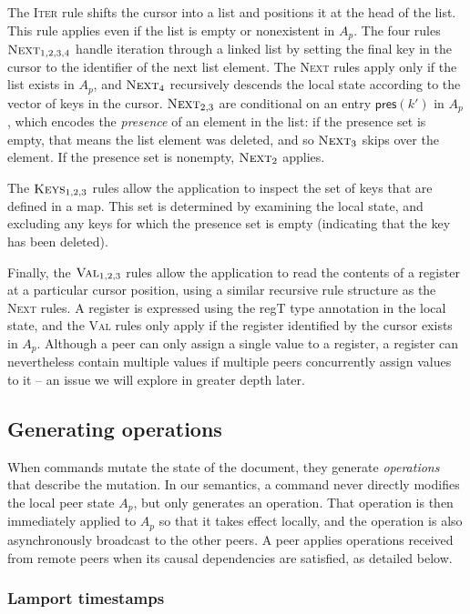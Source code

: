 \documentclass[10pt,journal,compsoc]{IEEEtran}
\begin{document}
The \textsc{Iter} rule shifts the cursor into a list and positions it at the \textsf{head} of the list. This rule applies even if the list is empty or nonexistent in $A_p$. The four rules $\textsc{Next}_{1,2,3,4}$ handle iteration through a linked list by setting the final key in the cursor to the identifier of the next list element. The \textsc{Next} rules apply only if the list exists in $A_p$, and $\textsc{Next}_4$ recursively descends the local state according to the vector of keys in the cursor. $\textsc{Next}_{2,3}$ are conditional on an entry $\mathsf{pres}(k')$ in $A_p$, which encodes the \emph{presence} of an element in the list: if the presence set is empty, that means the list element was deleted, and so $\textsc{Next}_3$ skips over the element. If the presence set is nonempty, $\textsc{Next}_2$ applies.

The $\textsc{Keys}_{1,2,3}$ rules allow the application to inspect the set of keys that are defined in a map. This set is determined by examining the local state, and excluding any keys for which the presence set is empty (indicating that the key has been deleted).

Finally, the $\textsc{Val}_{1,2,3}$ rules allow the application to read the contents of a register at a particular cursor position, using a similar recursive rule structure as the \textsc{Next} rules. A register is expressed using the \textsf{regT} type annotation in the local state, and the \textsc{Val} rules only apply if the register identified by the cursor exists in $A_p$. Although a peer can only assign a single value to a register, a register can nevertheless contain multiple values if multiple peers concurrently assign values to it -- an issue we will explore in greater depth later.

\subsection{Generating operations}

When commands mutate the state of the document, they generate \emph{operations} that describe the mutation. In our semantics, a command never directly modifies the local peer state $A_p$, but only generates an operation. That operation is then immediately applied to $A_p$ so that it takes effect locally, and the operation is also asynchronously broadcast to the other peers. A peer applies operations received from remote peers when its causal dependencies are satisfied, as detailed below.

\subsubsection{Lamport timestamps}
\end{document}
